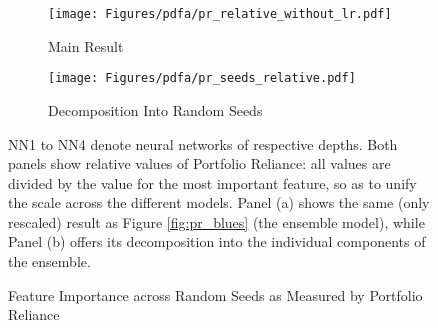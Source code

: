 		\begin{figure}	
			\centering		
			\begin{subfigure}[t]{\textwidth}
				\texttt{[image: Figures/pdfa/pr\_relative\_without\_lr.pdf]}
				\caption{Main Result}
				\label{fig:pr_seeds_main}
			\end{subfigure}
			
			\begin{subfigure}[t]{\textwidth}
				\centering
				\texttt{[image: Figures/pdfa/pr\_seeds\_relative.pdf]}
				\caption{Decomposition Into Random Seeds}
				\label{fig:pr_seeds_relative}
			\end{subfigure}
			\caption{Feature Importance across Random Seeds as Measured by Portfolio Reliance}
			\label{fig:pr_seeds}
			\medskip
			\small
			NN1 to NN4 denote neural networks of respective depths. Both panels show relative values of Portfolio Reliance: all values are divided by the value for the most important feature, so as to unify the scale across the different models. Panel (a) shows the same (only rescaled) result as Figure \ref{fig:pr_blues} (the ensemble model), while Panel (b) offers its decomposition into the individual components of the ensemble.
		\end{figure}
	
	